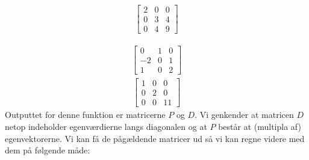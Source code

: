 \documentclass[letterpaper,10pt,english]{jupyterBook}
\begin{document}
\begin{sphinxVerbatim}[commandchars=\\\{\}]
\end{sphinxVerbatim}
\begin{equation*}
\begin{split}\displaystyle \left[\begin{matrix}2 & 0 & 0\\0 & 3 & 4\\0 & 4 & 9\end{matrix}\right]\end{split}
\end{equation*}
\begin{sphinxVerbatim}[commandchars=\\\{\}]
\end{sphinxVerbatim}
\begin{equation*}
\begin{split}\displaystyle \left[\begin{matrix}0 & 1 & 0\\-2 & 0 & 1\\1 & 0 & 2\end{matrix}\right]\end{split}
\end{equation*}\begin{equation*}
\begin{split}\displaystyle \left[\begin{matrix}1 & 0 & 0\\0 & 2 & 0\\0 & 0 & 11\end{matrix}\right]\end{split}
\end{equation*}
Outputtet for denne funktion er matricerne \(P\) og \(D\). Vi genkender at matricen \(D\) netop indeholder egenværdierne langs diagonalen og at \(P\) består at (multipla af) egenvektorerne. Vi kan få de pågældende matricer ud så vi kan regne videre med dem på følgende måde:
\end{document}
